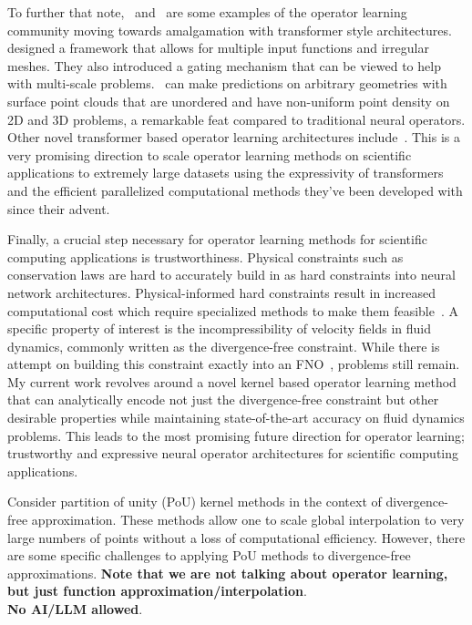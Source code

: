 \documentclass[12pt]{exam}
\begin{document}
\begin{questions}
To further that note,~\citep{hao2023gnot} and~\citep{liu2025geometry} are some examples of the operator learning community moving towards amalgamation with transformer style architectures.~\citep{hao2023gnot} designed a framework that allows for multiple input functions and irregular meshes. They also introduced a gating mechanism that can be viewed to help with multi-scale problems.~\citep{liu2025geometry} can make predictions on arbitrary geometries with surface point clouds that are unordered and have non-uniform point density on 2D and 3D problems, a remarkable feat compared to traditional neural operators. Other novel transformer based operator learning architectures include~\citep{cao2021choose, liu2024mitigating, li2022transformer}. This is a very promising direction to scale operator learning methods on scientific applications to extremely large datasets using the expressivity of transformers and the efficient parallelized computational methods they've been developed with since their advent.

Finally, a crucial step necessary for operator learning methods for scientific computing applications is trustworthiness. Physical constraints such as conservation laws are hard to accurately build in as hard constraints into neural network architectures. Physical-informed hard constraints result in increased computational cost which require specialized methods to make them feasible~\citep{chalapathi2024scaling}. A specific property of interest is the incompressibility of velocity fields in fluid dynamics, commonly written as the divergence-free constraint. While there is attempt on building this constraint exactly into an FNO~\citep{khorrami2024physics}, problems still remain. My current work revolves around a novel kernel based operator learning method that can analytically encode not just the divergence-free constraint but other desirable properties while maintaining state-of-the-art accuracy on fluid dynamics problems. This leads to the most promising future direction for operator learning; trustworthy and expressive neural operator architectures for scientific computing applications.
%
\pagebreak

\question Consider partition of unity (PoU) kernel methods in the context of divergence-free approximation. These methods allow one to scale global interpolation to very large numbers of points without a loss of computational efficiency. However, there are some specific challenges to applying PoU methods to divergence-free approximations. {\bf Note that we are not talking about operator learning, but just function approximation/interpolation}.\\
{\bf No AI/LLM allowed}.


\end{questions}
\end{document}
